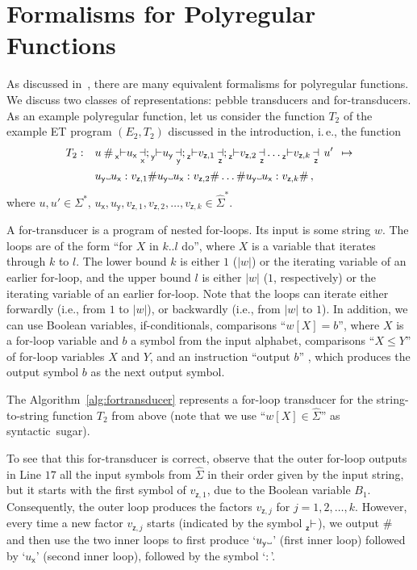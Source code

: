 \documentclass[
a4paper
]{article}
\theoremstyle{plain}
\theoremstyle{definition}
\theoremstyle{remark}
\newcommand\Vtextvisiblespace[1][.3em]{%
	\mbox{\kern.06em\vrule height.3ex}%
	\vbox{\hrule width#1}%
	\hbox{\vrule height.3ex}}
\DeclareMathOperator{\openmark}{\vdash}
\DeclareMathOperator{\closemark}{\dashv}
\newcommand{\open}[1]{\prescript{}{#1}{\openmark}}
\newcommand{\close}[1]{\closemark_{#1}}
\newcommand{\varsx}{\ensuremath{\textsf{x}}}
\newcommand{\varsy}{\ensuremath{\textsf{y}}}
\newcommand{\varsz}{\ensuremath{\textsf{z}}}
\begin{document}
 	
\section{Formalisms for Polyregular Functions}\label{sec:polyregAppendix}
	
As discussed in~\cite{Bojanczyk22, Bojanczyk2018}, there are many equivalent formalisms for polyregular functions. We discuss two classes of representations: pebble transducers and for-transducers. As an example polyregular function, let us consider the function $T_2$ of the example ET program $(E_2, T_2)$ discussed in the introduction, i.\,e., the function 
\begin{align*}
T_2:\ \ \  & u \: \# \open{\varsx} u_{\varsx} \close{\varsx} ; \open{\varsy} u_{\varsy} \close{\varsy} ; \open{\varsz} v_{\varsz, 1} \close{\varsz}; \open{\varsz} v_{\varsz, 2} \close{\varsz} \ldots \open{\varsz} v_{\varsz, k} \close{\varsz} \: u' \:\: \mapsto  \\
&  u_{\varsy} \Vtextvisiblespace u_{\varsx}:v_{\varsz, 1} \# u_{\varsy} \Vtextvisiblespace u_{\varsx}:v_{\varsz, 2} \# \ldots \# u_{\varsy} \Vtextvisiblespace u_{\varsx}:v_{\varsz, k} \#\,,
\end{align*}
where $u, u' \in \Sigma^*$, $u_{\varsx}, u_{\varsy}, v_{\varsz, 1}, v_{\varsz, 2}, \ldots, v_{\varsz, k} \in \widehat{\Sigma}^*$.

A for-transducer is a program of nested for-loops. Its input is some string $w$. The loops are of the form ``for $X$ in $k..l$ do'', where $X$ is a variable that iterates through $k$ to $l$. The lower bound $k$ is either $1$ ($|w|$) or the iterating variable of an earlier for-loop, and the upper bound $l$ is either $|w|$ ($1$, respectively) or the iterating variable of an earlier for-loop. 
Note that the loops can iterate either forwardly (i.e., from $1$ to $|w|$), or backwardly (i.e., from $|w|$ to $1$). 
In addition, we can use Boolean variables, if-conditionals, comparisons ``$w[X] = b$'', where $X$ is a for-loop variable and $b$ a symbol from the input alphabet, comparisons ``$X \leq Y$'' of for-loop variables $X$ and $Y$, and an instruction ``output $b$'' , which produces the output symbol $b$ as the next output symbol. 

The Algorithm~\ref{alg:fortransducer} represents a for-loop transducer for the string-to-string function $T_2$ from above (note that we use ``$w[X] \in \widehat{\Sigma}$'' as syntactic~sugar).

To see that this for-transducer is correct, observe that the outer for-loop outputs in Line $17$ all the input symbols from $\widehat{\Sigma}$ in their order given by the input string, but it starts with the first symbol of $v_{\varsz, 1}$, due to the Boolean variable $B_1$. Consequently, the outer loop produces the factors $v_{\varsz, j}$ for $j = 1, 2, \ldots, k$. However, every time a new factor $v_{\varsz, j}$ starts (indicated by the symbol $\open{\varsz}$), we output $\#$ and then use the two inner loops to first produce `$u_{\varsy} \Vtextvisiblespace$' (first inner loop) followed by `$u_{\varsx}$' (second inner loop), followed by the symbol `$:$'.
\end{document}
